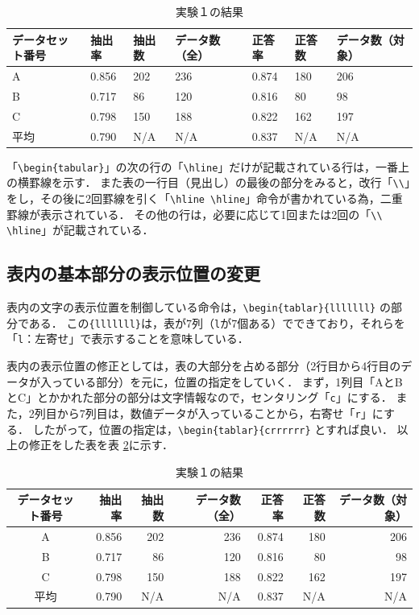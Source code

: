 \begin{table}[H]
\caption{実験１の結果}
\centering
\begin{tabular}{lllllll}
\hline
データセット番号 & 抽出率 & 抽出数 & データ数（全） & 正答率 & 正答数 & データ数（対象）\\ \hline \hline
A & 0.856 & 202 & 236 & 0.874 & 180 & 206\\ \hline
B & 0.717 & 86 & 120 & 0.816 & 80 & 98\\ \hline
C & 0.798 & 150 & 188 & 0.822 & 162 & 197\\ \hline \hline
平均 & 0.790 & N/A & N/A & 0.837 & N/A & N/A\\ \hline
\end{tabular}
\label{table:resultEx1b}
\end{table}

「\verb+\begin{tabular}+」の次の行の「\verb+\hline+」だけが記載されている行は，一番上の横罫線を示す．
また表の一行目（見出し）の最後の部分をみると，改行「\verb+\\+」をし，その後に2回罫線を引く「\verb+\hline \hline+」命令が書かれている為，二重罫線が表示されている．
その他の行は，必要に応じて1回または2回の「\verb+\\ \hline+」が記載されている．

\subsection{表内の基本部分の表示位置の変更}
表内の文字の表示位置を制御している命令は，\verb+\begin{tablar}{lllllll}+
の部分である．
この\verb+{lllllll}+は，表が7列（\verb+l+が7個ある）でできており，それらを「\verb+l+：左寄せ」で表示することを意味している．

表内の表示位置の修正としては，表の大部分を占める部分（2行目から4行目のデータが入っている部分）を元に，位置の指定をしていく．
まず，1列目「AとBとC」とかかれた部分の部分は文字情報なので，センタリング「\verb+c+」にする．
また，2列目から7列目は，数値データが入っていることから，右寄せ「\verb+r+」にする．
したがって，位置の指定は，\verb+\begin{tablar}{crrrrrr}+ とすれば良い．
以上の修正をした表を表 \ref{table:resultEx1c}に示す．
\begin{table}[H]
\caption{実験１の結果}
\centering
\begin{tabular}{crrrrrr}
\hline
データセット番号 & 抽出率 & 抽出数 & データ数（全） & 正答率 & 正答数 & データ数（対象）\\ \hline \hline
A & 0.856 & 202 & 236 & 0.874 & 180 & 206\\ \hline
B & 0.717 & 86 & 120 & 0.816 & 80 & 98\\ \hline
C & 0.798 & 150 & 188 & 0.822 & 162 & 197\\ \hline \hline
平均 & 0.790 & N/A & N/A & 0.837 & N/A & N/A\\ \hline
\end{tabular}
\label{table:resultEx1c}
\end{table}

